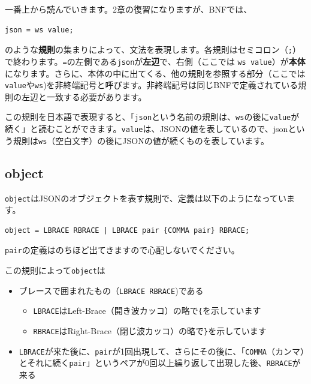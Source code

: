 一番上から読んでいきます。2章の復習になりますが、BNFでは、

\begin{verbatim}
json = ws value;
\end{verbatim}

のような\textbf{規則}の集まりによって、文法を表現します。各規則はセミコロン（\texttt{;}）で終わります。\texttt{=}の左側である\texttt{json}が\textbf{左辺}で、右側（ここでは
\texttt{ws\ value}）が\textbf{本体}になります。さらに、本体の中に出てくる、他の規則を参照する部分（ここでは\texttt{value}や\texttt{ws})を非終端記号と呼びます。非終端記号は同じBNFで定義されている規則の左辺と一致する必要があります。

この規則を日本語で表現すると、「\texttt{json}という名前の規則は、\texttt{ws}の後に\texttt{value}が続く」と読むことができます。\texttt{value}は、JSONの値を表しているので、jsonという規則は\texttt{ws}（空白文字）の後にJSONの値が続くものを表しています。

\hypertarget{chapter3-object}{%
\subsection{object}\label{chapter3-object}}

\texttt{object}はJSONのオブジェクトを表す規則で、定義は以下のようになっています。

\begin{verbatim}
object = LBRACE RBRACE | LBRACE pair {COMMA pair} RBRACE;
\end{verbatim}

\texttt{pair}の定義はのちほど出てきますので心配しないでください。

この規則によって\texttt{object}は

\begin{itemize}
\tightlist
\item
  ブレースで囲まれたもの（\texttt{LBRACE\ RBRACE})である

  \begin{itemize}
  \tightlist
  \item
    \texttt{LBRACE}はLeft-Brace（開き波カッコ）の略で\texttt{\{}を示しています
  \item
    \texttt{RBRACE}はRight-Brace（閉じ波カッコ）の略で\texttt{\}}を示しています
  \end{itemize}
\item
  \texttt{LBRACE}が来た後に、\texttt{pair}が1回出現して、さらにその後に、「\texttt{COMMA}（カンマ）とそれに続く\texttt{pair}」というペアが0回以上繰り返して出現した後、\texttt{RBRACE}が来る
\end{itemize}

